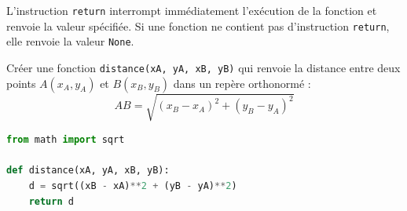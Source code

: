 \begin{remarque}
	L'instruction \lstinline|return| interrompt immédiatement l'exécution de la fonction et renvoie la valeur spécifiée. Si une fonction ne contient pas d'instruction \lstinline|return|, elle renvoie la valeur \lstinline|None|.
\end{remarque}

\begin{methode}
	Créer une fonction \lstinline|distance(xA, yA, xB, yB)| qui renvoie la distance entre deux points $A(x_A, y_A)$ et $B(x_B, y_B)$ dans un repère orthonormé :
	\[
		AB = \sqrt{(x_B - x_A)^2 + (y_B - y_A)^2}
	\]

	\begin{correction}
		\nline
		\begin{lstlisting}[language=Python]
from math import sqrt

def distance(xA, yA, xB, yB):
    d = sqrt((xB - xA)**2 + (yB - yA)**2)
    return d
\end{lstlisting}
	\end{correction}
\end{methode}
